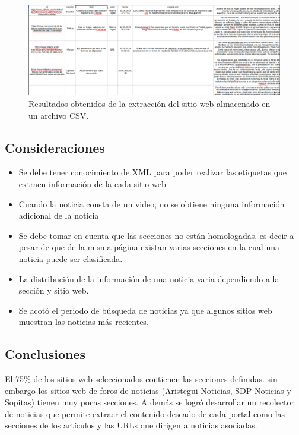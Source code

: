 \begin{figure}[H]
  \centering
  \includegraphics[scale=.3]{imagenes/Capitulo5/9}
  \caption{Resultados obtenidos de la extracción del sitio web almacenado en un archivo CSV.}
  \label{fig:nueve}
\end{figure}

\subsection{Consideraciones}
\begin{itemize}
  \item Se debe tener conocimiento de XML para poder realizar las etiquetas que extraen información de la cada sitio web
  \item Cuando la noticia consta de un video, no se obtiene ninguna información adicional de la noticia
  \item Se debe tomar en cuenta que las secciones no están homologadas, es decir a pesar de que de la misma página existan varias secciones 
en la cual una noticia puede ser clasificada.
  \item La distribución de la información de una noticia varia dependiendo a la sección y sitio web.
  \item Se acotó el periodo de búsqueda de noticias ya que algunos sitios web muestran las noticias más recientes.
\end{itemize}

\subsection{Conclusiones}
El 75\% de los sitios web seleccionados contienen las secciones definidas. sin embargo
los sitios web de foros de noticias (Aristegui Noticias, SDP Noticias y Sopitas) tienen muy pocas secciones. A demás 
se logró desarrollar un recolector de noticias que permite extraer el contenido deseado de cada portal como las secciones de los artículos y las URLs que dirigen a noticias asociadas.

